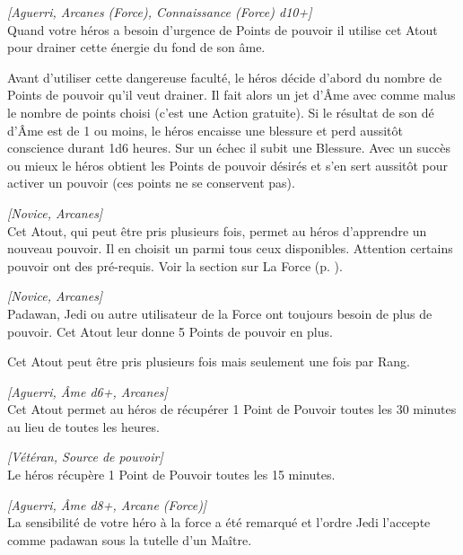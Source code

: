 \begin{description}[align=left]
    \item [Drain de l’\^ame]
        \emph{[Aguerri, Arcanes (Force), Connaissance (Force) d10+]}\\
        Quand votre héros a besoin d’urgence de Points de pouvoir il utilise cet Atout pour drainer cette énergie du fond de son âme. 

        Avant d’utiliser cette dangereuse faculté, le héros décide d’abord du nombre de Points de pouvoir qu’il veut drainer. Il fait alors un jet d’\^Ame avec comme malus le nombre de points choisi (c’est une Action gratuite). Si le résultat de son dé d’\^Ame est de 1 ou moins, le héros encaisse une blessure et perd aussitôt conscience durant 1d6 heures. Sur un échec il subit une Blessure. Avec un succès ou mieux le héros obtient les Points de pouvoir désirés et s’en sert aussitôt pour activer un pouvoir (ces points ne se conservent pas).

    \item [Nouveau pouvoir]
        \emph{[Novice, Arcanes]}\\
        Cet Atout, qui peut être pris plusieurs fois, permet au héros d’apprendre un nouveau pouvoir. Il en choisit un parmi tous ceux disponibles. Attention certains pouvoir ont des pré-requis. Voir la section sur La Force (p. \pageref{sec:force}).

    \item [Points de pouvoir]
        \emph{[Novice, Arcanes]}\\
        Padawan, Jedi ou autre utilisateur de la Force ont toujours besoin de plus de pouvoir. Cet Atout leur donne 5 Points de pouvoir en plus.

        Cet Atout peut être pris plusieurs fois mais seulement une fois par Rang.

    \item [Source de pouvoir]
        \emph{[Aguerri, Âme d6+, Arcanes]}\\
        Cet Atout permet au héros de récupérer 1 Point de Pouvoir toutes les 30 minutes au lieu de toutes les heures.

    \item [Grande source de pouvoir]
        \emph{[Vétéran, Source de pouvoir]}\\
        Le héros récupère 1 Point de Pouvoir toutes les 15 minutes.

    \item [Padawan]
        \emph{[Aguerri, \^Ame d8+, Arcane (Force)]}\\
        La sensibilité de votre héro à la force a été remarqué et l’ordre Jedi l’accepte comme padawan sous la tutelle d’un Maître. 


\end{description}

